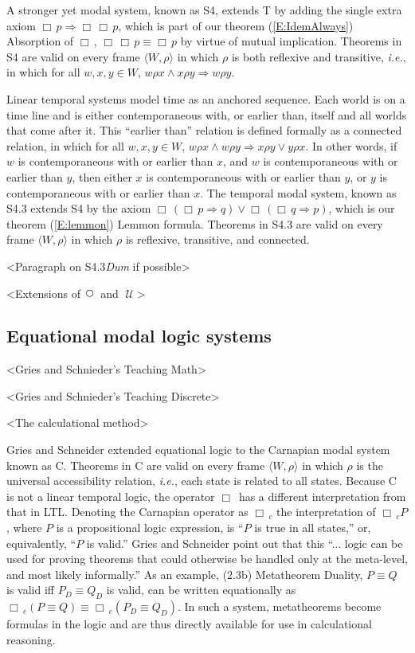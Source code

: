 \documentclass[12pt, fleqn, leqno]{article}
\newcommand{\impl}{\ensuremath{\Rightarrow}}        %
\newcommand{\Until}{\;\mathcal{U}\;}
\newcommand{\Next}{\;\,\text{\raisebox{3.5pt}{\circle{6}}}}
\newcommand{\Always}{\Box\,}
\begin{document}
A stronger yet modal system, known as S4, extends T by adding the single extra axiom $\Always p\impl \Always\Always p$, which is part of our theorem (\ref{E:IdemAlways}) Absorption of $\Always$, $\Always\Always p \equiv \Always p$ by virtue of mutual implication.
Theorems in S4 are valid on every frame $\langle W,\rho\rangle$ in which $\rho$ is both reflexive and transitive, \textit{i.e.}, in which for all $w,x,y\in W$, $w\rho x\land x\rho y\impl w\rho y$.

Linear temporal systems model time as an anchored sequence.
Each world is on a time line and is either contemporaneous with, or earlier than, itself and all worlds that come after it.
This ``earlier than'' relation is defined formally as a connected relation, in which for all $w,x,y\in W$, $w\rho x\land w\rho y\impl x\rho y\lor y\rho x$.
In other words, if $w$ is contemporaneous with or earlier than $x$, and $w$ is contemporaneous with or earlier than $y$, then either $x$ is contemporaneous with or earlier than $y$, or $y$ is contemporaneous with or earlier than $x$.
The temporal modal system, known as S4.3 extends S4 by the axiom $\Always(\Always p\impl q)\lor\Always(\Always q\impl p)$, which is our theorem (\ref{E:lemmon}) Lemmon formula.
Theorems in S4.3 are valid on every frame $\langle W,\rho\rangle$ in which $\rho$ is reflexive, transitive, and connected. \cite{Hughes}

<Paragraph on S4.3\textit{Dum} if possible>

<Extensions of $\Next$ and $\Until$>

\subsection{Equational modal logic systems}

<Gries and Schnieder's Teaching Math> \cite{GriesTeachingMath}

<Gries and Schnieder's Teaching Discrete> \cite{GriesTeachingDiscrete}

<The calculational method> \cite{Backhouse}

Gries and Schneider extended equational logic to the Carnapian modal system known as C. \cite{Gries95addingthe}
Theorems in C are valid on every frame $\langle W,\rho\rangle$ in which $\rho$ is the universal accessibility relation, \textit{i.e.}, each state is related to all states.
Because C is not a linear temporal logic, the operator $\Always$ has a different interpretation from that in LTL.
Denoting the Carnapian operator as $\Always_c$ the interpretation of $\Always_c P$, where $P$ is a propositional logic expression, is ``$P$ is true in all states,'' or, equivalently, ``$P$ is valid.''
Gries and Schneider point out that this ``... logic can be used for proving theorems that could otherwise be handled only at the meta-level, and most likely informally.''
As an example, (2.3b) Metatheorem Duality, $P\equiv Q$ is valid iff $P_D\equiv Q_D$ is valid, can be written equationally as $\Always_c(P\equiv Q)\equiv \Always_c(P_D\equiv Q_D)$.
In such a system, metatheorems become formulas in the logic and are thus directly available for use in calculational reasoning.
\end{document}

